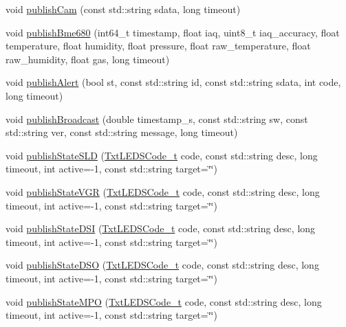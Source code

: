 \begin{DoxyCompactItemize}
void \hyperlink{classft_1_1_txt_mqtt_factory_client_a4a442350cebe528f0fc90dbb2f67c1de}{publish\+Cam} (const std\+::string sdata, long timeout)
\item 
void \hyperlink{classft_1_1_txt_mqtt_factory_client_a225a231a4ec63ef047625e5cd2ec33a2}{publish\+Bme680} (int64\+\_\+t timestamp, float iaq, uint8\+\_\+t iaq\+\_\+accuracy, float temperature, float humidity, float pressure, float raw\+\_\+temperature, float raw\+\_\+humidity, float gas, long timeout)
\item 
void \hyperlink{classft_1_1_txt_mqtt_factory_client_aad1434a675a1ad95bc526747bae82865}{publish\+Alert} (bool st, const std\+::string id, const std\+::string sdata, int code, long timeout)
\item 
void \hyperlink{classft_1_1_txt_mqtt_factory_client_afc7d9b8edcead431fb67c732152b55a1}{publish\+Broadcast} (double timestamp\+\_\+s, const std\+::string sw, const std\+::string ver, const std\+::string message, long timeout)
\item 
void \hyperlink{classft_1_1_txt_mqtt_factory_client_ab53fbf613676b49e98352a6b226ab3d0}{publish\+State\+S\+LD} (\hyperlink{namespaceft_a14147563037506fac6464a9f6bcbad40}{Txt\+L\+E\+D\+S\+Code\+\_\+t} code, const std\+::string desc, long timeout, int active=-\/1, const std\+::string target=\char`\"{}\char`\"{})
\item 
void \hyperlink{classft_1_1_txt_mqtt_factory_client_a856c542e74f14e6a12cca62dd3566401}{publish\+State\+V\+GR} (\hyperlink{namespaceft_a14147563037506fac6464a9f6bcbad40}{Txt\+L\+E\+D\+S\+Code\+\_\+t} code, const std\+::string desc, long timeout, int active=-\/1, const std\+::string target=\char`\"{}\char`\"{})
\item 
void \hyperlink{classft_1_1_txt_mqtt_factory_client_ae68fac9f8874b963b2cf1a4ee9756211}{publish\+State\+D\+SI} (\hyperlink{namespaceft_a14147563037506fac6464a9f6bcbad40}{Txt\+L\+E\+D\+S\+Code\+\_\+t} code, const std\+::string desc, long timeout, int active=-\/1, const std\+::string target=\char`\"{}\char`\"{})
\item 
void \hyperlink{classft_1_1_txt_mqtt_factory_client_a0c083001539aba0ec4cfbe5d98974d8f}{publish\+State\+D\+SO} (\hyperlink{namespaceft_a14147563037506fac6464a9f6bcbad40}{Txt\+L\+E\+D\+S\+Code\+\_\+t} code, const std\+::string desc, long timeout, int active=-\/1, const std\+::string target=\char`\"{}\char`\"{})
\item 
void \hyperlink{classft_1_1_txt_mqtt_factory_client_adc12b60d1c0e4a7fc342a215bb055779}{publish\+State\+M\+PO} (\hyperlink{namespaceft_a14147563037506fac6464a9f6bcbad40}{Txt\+L\+E\+D\+S\+Code\+\_\+t} code, const std\+::string desc, long timeout, int active=-\/1, const std\+::string target=\char`\"{}\char`\"{})

\end{DoxyCompactItemize}
